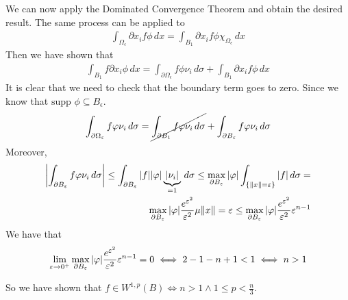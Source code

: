 We can now apply the Dominated Convergence Theorem and obtain the desired result. 
The same process can be applied to
\[
    \begin{split}
        \int_{\Omega_\epsilon} \partial x_i f \phi \, dx = \int_{B_1} \partial x_i f \phi \chi_{\Omega_\epsilon} \, dx
    \end{split}
\]
Then we have shown that 
\[
    \begin{split}
        \int_{B_1} f \partial x_i \phi \, dx = \int_{\partial\Omega_\epsilon} f \phi \nu_i \, d\sigma + \int_{B_1} \partial x_i f \phi \, dx
    \end{split}
\]
It is clear that we need to check that the boundary term goes to zero. Since we know that \(\text{supp } \phi \subseteq B_\epsilon\).
\[
    \begin{split}
        \int_{\partial\Omega_\epsilon} f \phi \nu_i \, d\sigma = \cancel{\int_{\partial B_1} f \phi \nu_i \, d\sigma} + \int_{\partial B_\epsilon} f \phi \nu_i \, d\sigma
    \end{split}
\]
Moreover,
\[
    \begin{split}
        \abs{\int_{\partial B_\epsilon} f \phi \nu_i \, d\sigma} \leq \int_{\partial B_\epsilon} \abs{f} \abs{\phi} \underbrace{\abs{\nu_i}}_{=1} \, d\sigma \leq \max_{\partial B_\epsilon} \abs{\phi} \int_{\{ \norm{x} = \epsilon \}} \abs{f} \, d\sigma = \\
        \max_{\partial B_\epsilon} \abs{\phi} \frac{e^{\epsilon^2}}{\epsilon^2} \mu{\norm{x} = \epsilon} \leq \max_{\partial B_\epsilon} \abs{\phi} \frac{e^{\epsilon^2}}{\epsilon^2} \epsilon^{n-1}
    \end{split}
\]
We have that 
\[
    \begin{split}
        \lim_{\epsilon \to 0^+} \max_{\partial B_\epsilon} \abs{\phi} \frac{e^{\epsilon^2}}{\epsilon^2} \epsilon^{n-1} = 0 \iff 2 - 1 - n + 1 < 1 \iff n > 1
    \end{split}
\]

So we have shown that \(f \in W^{1, p}(B) \iff n > 1 \land 1 \leq p < \frac{n}{3}\).

